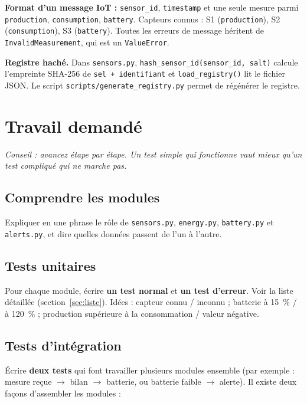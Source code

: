 \documentclass[11pt,a4paper]{article}
\begin{document}
\noindent\textbf{Format d'un message IoT :}
\texttt{sensor\_id}, \texttt{timestamp} et une seule mesure parmi \texttt{production},
\texttt{consumption}, \texttt{battery}. Capteurs connus : S1 (\texttt{production}),
S2 (\texttt{consumption}), S3 (\texttt{battery}). Toutes les erreurs de message héritent de
\texttt{InvalidMeasurement}, qui est un \texttt{ValueError}.

\noindent\textbf{Registre haché.} Dans \texttt{sensors.py}, \texttt{hash\_sensor\_id(sensor\_id, salt)} calcule
l'empreinte SHA-256 de \texttt{sel + identifiant} et \texttt{load\_registry()} lit le fichier JSON.
Le script \texttt{scripts/generate\_registry.py} permet de régénérer le registre.

\section{Travail demandé}

\textit{Conseil : avancez étape par étape. Un test simple qui fonctionne vaut mieux
qu'un test compliqué qui ne marche pas.}

\subsection{Comprendre les modules}

Expliquer en une phrase le rôle de \texttt{sensors.py}, \texttt{energy.py},
\texttt{battery.py} et \texttt{alerts.py}, et dire quelles données passent de l'un à l'autre.

\subsection{Tests unitaires}

Pour chaque module, écrire \textbf{un test normal} et \textbf{un test d'erreur}.
Voir la liste détaillée (section~\ref{sec:liste}). Idées : capteur connu / inconnu ; batterie à 15~\% / à 120~\% ;
production supérieure à la consommation / valeur négative.

\subsection{Tests d'intégration}

Écrire \textbf{deux tests} qui font travailler plusieurs modules ensemble
(par exemple : mesure reçue $\rightarrow$ bilan $\rightarrow$ batterie, ou batterie
faible $\rightarrow$ alerte). Il existe deux façons d'assembler les modules :
\end{document}
